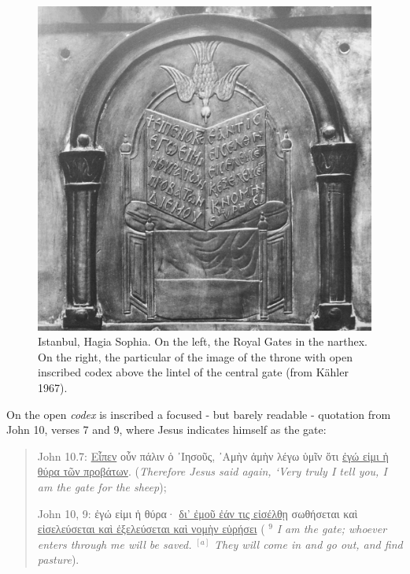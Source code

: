 \documentclass[amsthm,ebook]{saparticle}
\begin{document}
\begin{figure}[!hbp]
\begin{minipage}[c]{0.57\textwidth}
 \includegraphics[width=\columnwidth]{FelleVisualFeaturesofinscriptionsEAGLE2016FullPaper-img013.jpg}
\end{minipage}
\caption{Istanbul, Hagia Sophia. On the left, the Royal Gates in the narthex. On the right, the particular of the image
of the throne with open inscribed codex above the lintel of the central gate (from Kähler 1967).}
\label{fig:9}
\end{figure}

On the open \emph{codex} is inscribed a focused - but barely readable - quotation from John 10, verses 7 and 9, where Jesus
indicates himself as the gate: 

\begin{quotation}
John 10.7: 
\underline{Εἶπεν} οὖν πάλιν ὁ ᾿Ιησοῦς, ᾿Αμὴν ἀμὴν λέγω ὑμῖν ὅτι \underline{ἐγώ εἰμι ἡ θύρα τῶν προβάτων}.
 (\emph{Therefore Jesus said again, ‘Very truly I tell you, I am the gate for the sheep}); 

John 10, 9: 
ἐγώ εἰμι ἡ θύρα· \underline{δι' ἐμοῦ ἐάν τις εἰσέλθῃ} σωθήσεται καὶ \underline{εἰσελεύσεται καὶ ἐξελεύσεται καὶ νομὴν εὑρήσει}
  ( $^\textit{9}$ \emph{I am the gate;
whoever enters through me will be saved.} $^{[a]}$ \emph{They will come in and go out, and find pasture}).

\end{quotation}
\end{document}
